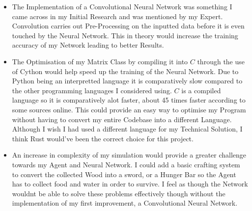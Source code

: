 \begin{flushleft}
        \begin{itemize}
            \item The Implementation of a Convolutional Neural Network was something I came across in my Initial Research and was mentioned by my Expert.
            Convolution carries out Pre-Processing on the inputted data before it is even touched by the Neural Network. This in theory would increase
            the training accuracy of my Network leading to better Results. \\
            
            \vspace{0.2cm}
            \item The Optimisation of my Matrix Class by compiling it into $C$ through the use of Cython would help speed up the training of the Neural
            Network. Due to Python being an interpretted language it is comparatively slow compared to the other programming languages I considered
            using. $C$ is a compiled language so it is comparatively alot faster, about 45 times faster according to some sources online. This could
            provide an easy way to optimise my Program without having to convert my entire Codebase into a different Language. Although I wish I
            had used a different language for my Technical Solution, I think Rust would've been the correct choice for this project. \\

            \vspace{0.2cm}
            \item An increase in complexity of my simulation would provide a greater challenge towards my Agent and Neural Network. I could add a basic
            crafting system to convert the collected Wood into a sword, or a Hunger Bar so the Agent has to collect food and water in order to survive.
            I feel as though the Network wouldnt be able to solve these problems effectively though without the implementation of my first improvement,
            a Convolutional Neural Network. \\

            \vspace{0.2cm}
        \end{itemize}
        \vspace{0.5cm}
\end{flushleft}